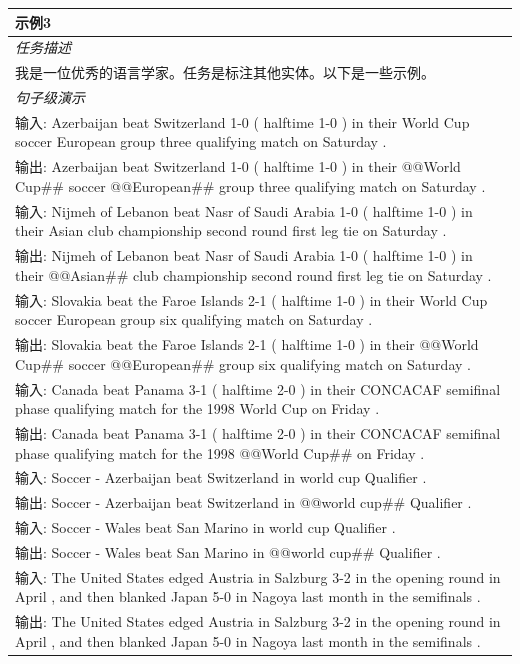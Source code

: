 \documentclass[supercite]{Experimental_Report}
\theoremstyle{definition}
\begin{document}
\begin{table}[th!]
{\begin{tabular}{l}
\textbf{示例3} \\\midrule
       	\textit{任务描述} \\
我是一位优秀的语言学家。任务是标注其他实体。以下是一些示例。 \\\midrule
\textit{句子级演示} \\
输入: Azerbaijan beat Switzerland 1-0 ( halftime 1-0 ) in their World Cup soccer European group three qualifying match on Saturday . \\
输出: Azerbaijan beat Switzerland 1-0 ( halftime 1-0 ) in their @@World Cup\#\# soccer @@European\#\# group three qualifying match on Saturday . \\
输入: Nijmeh of Lebanon beat Nasr of Saudi Arabia 1-0 ( halftime 1-0 ) in their Asian club championship second round first leg tie on Saturday . \\
输出: Nijmeh of Lebanon beat Nasr of Saudi Arabia 1-0 ( halftime 1-0 ) in their @@Asian\#\# club championship second round first leg tie on Saturday . \\
输入: Slovakia beat the Faroe Islands 2-1 ( halftime 1-0 ) in their World Cup soccer European group six qualifying match on Saturday . \\
输出: Slovakia beat the Faroe Islands 2-1 ( halftime 1-0 ) in their @@World Cup\#\# soccer @@European\#\# group six qualifying match on Saturday . \\
输入: Canada beat Panama 3-1 ( halftime 2-0 ) in their CONCACAF semifinal phase qualifying match for the 1998 World Cup on Friday . \\
输出: Canada beat Panama 3-1 ( halftime 2-0 ) in their CONCACAF semifinal phase qualifying match for the 1998 @@World Cup\#\# on Friday . \\
输入: Soccer - Azerbaijan beat Switzerland in world cup Qualifier . \\
输出: Soccer - Azerbaijan beat Switzerland in @@world cup\#\# Qualifier . \\
输入: Soccer - Wales beat San Marino in world cup Qualifier . \\
输出: Soccer - Wales beat San Marino in @@world cup\#\# Qualifier . \\
输入: The United States edged Austria in Salzburg 3-2 in the opening round in April , and then blanked Japan 5-0 in Nagoya last month in the semifinals . \\
输出: The United States edged Austria in Salzburg 3-2 in the opening round in April , and then blanked Japan 5-0 in Nagoya last month in the semifinals . \\

\end{tabular}}
\end{table}
\end{document}
